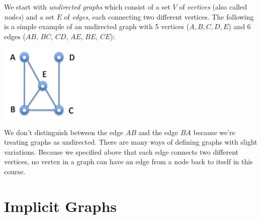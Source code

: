 We start with \emph{undirected graphs} which consist of a set $V$ of
\emph{vertices} (also called \emph{nodes}) and a set $E$ of
\emph{edges}, each connecting two different vertices.  The following
is a simple example of an undirected graph with 5 vertices ($A, B, C,
D, E$) and 6 edges ($AB$, $BC$, $CD$, $AE$, $BE$, $CE$):
\begin{center}
  \includegraphics[width=0.3\textwidth]{img/graph0.png}
\end{center}

We don't distinguish between the edge $AB$ and the edge $BA$ because
we're treating graphs as undirected.  There are many ways of defining
graphs with slight variations. Because we specified above that each
edge connects two different vertices, no vertex in a graph can have an
edge from a node back to itself in this course.


\section{Implicit Graphs}
\label{sec:graphs:implicit_graphs}

